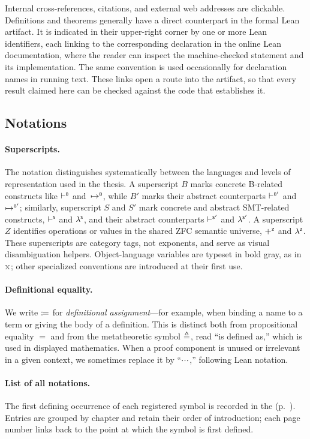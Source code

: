 Internal cross-references, citations, and external web addresses are clickable.
Definitions and theorems generally have a direct counterpart in the formal Lean
artifact. It is indicated in their upper-right corner by one or more Lean
identifiers, each linking to the corresponding declaration in the online Lean
documentation, where the reader can inspect the machine-checked statement and
its implementation. The same convention is used occasionally for declaration
names in running text. These links open a route into the artifact, so that every
result claimed here can be checked against the code that establishes it.

\subsection{Notations}
\paragraph{Superscripts.}
The notation distinguishes systematically between the languages and levels of
representation used in the thesis. A superscript \(B\) marks concrete B-related
constructs like \(\vdash^{\scriptscriptstyle{\mathsf{B}}}\) and \(\mathbin{\,\mapsto^{\scriptscriptstyle{\mathsf{B}}}}\),
while \(B'\) marks their abstract counterparts \(\vdash^{\scriptscriptstyle{\mathsf{B'}}}\) and \(\mapsto^{\scriptscriptstyle{\mathsf{B'}}}\);
similarly, superscript \(S\) and \(S'\) mark concrete and abstract SMT-related constructs, \eg
\(\vdash^{\scriptscriptstyle{\mathsf{S}}}\) and \(\lambda^{\scriptscriptstyle{\mathsf{S}}}\), and their abstract counterparts \(\vdash^{\scriptscriptstyle{\mathsf{S'}}}\) and \(\lambda^{\scriptscriptstyle{\mathsf{S'}}}\).
A superscript \(Z\) identifies
operations or values in the shared ZFC semantic universe, \eg \(\mathbin{+^{\scriptscriptstyle{\mathsf{Z}}}}\) and \(\lambda^{\scriptscriptstyle{\mathsf{Z}}}\).
These superscripts are category tags, not exponents, and serve as visual
disambiguation helpers. Object-language variables are typeset in bold gray,
as in \(\var{x}\); other specialized conventions are introduced at their first use.

\paragraph{Definitional equality.}
We write \(\coloneq\) for \emph{definitional assignment}---for
example, when binding a name to a term or giving the body of a definition. This
is distinct both from propositional equality \(=\) and from the metatheoretic
symbol \(\triangleq\), read ``is defined as,'' which is used in
displayed mathematics. When a proof component is unused or irrelevant in a
given context, we sometimes replace it by ``\(\cdot\mkern-3.3mu\cdot\mkern-3.3mu\cdot\),'' following
Lean notation.

\paragraph{List of all notations.}
The first defining occurrence of each registered symbol is recorded in the
 (p.~\pageref{ch:list-of-notations}). Entries are grouped by chapter and retain
their order of introduction; each page number links back to the point at which
the symbol is first defined.